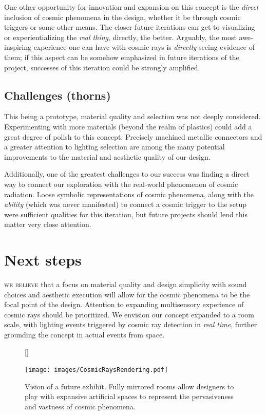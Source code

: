 \documentclass[12pt]{article}
\begin{document}
    One other opportunity for innovation and expansion on this concept is the \textit{direct} inclusion of cosmic phenomena in the design, whether it be through cosmic triggers or some other means. The closer future iterations can get to visualizing or experientializing the \textit{real thing}, directly, the better. Arguably, the most awe-inspiring experience one can have with cosmic rays is \textit{directly} seeing evidence of them; if this aspect can be somehow emphasized in future iterations of the project, successes of this iteration could be strongly amplified.
    

    \subsection{Challenges (thorns)}

    This being a prototype, material quality and selection was not deeply considered. Experimenting with more materials (beyond the realm of plastics) could add a great degree of polish to this concept. Precisely machined metallic connectors and a greater attention to lighting selection are among the many potential improvements to the material and aesthetic quality of our design.
    
    Additionally, one of the greatest challenges to our success was finding a direct way to connect our exploration with the real-world phenomenon of cosmic radiation. Loose symbolic representations of cosmic phenomena, along with the \textit{ability} (which was never manifested) to connect a cosmic trigger to the setup were sufficient qualities for this iteration, but future projects should lend this matter very close attention.
    
    
    \pagebreak
    \section{Next steps}

    \textsc{we believe} that a focus on material quality and design simplicity with sound choices and aesthetic execution will allow for the cosmic phenomena to be the focal point of the design. Attention to expanding multisensory experience of cosmic rays should be prioritized. We envision our concept expanded to a room scale, with lighting events triggered by cosmic ray detection in \textit{real time}, further grounding the concept in actual events from space.

    \begin{figure}[h]
        [\FBwidth]
        {\caption{Vision of a future exhibit. Fully mirrored rooms allow designers to play with expansive artificial spaces to represent the pervasiveness and vastness of cosmic phenomena.}\label{fig:scattering}}
        {\texttt{[image: images/CosmicRaysRendering.pdf]}}
    \end{figure}
    
\end{document}
